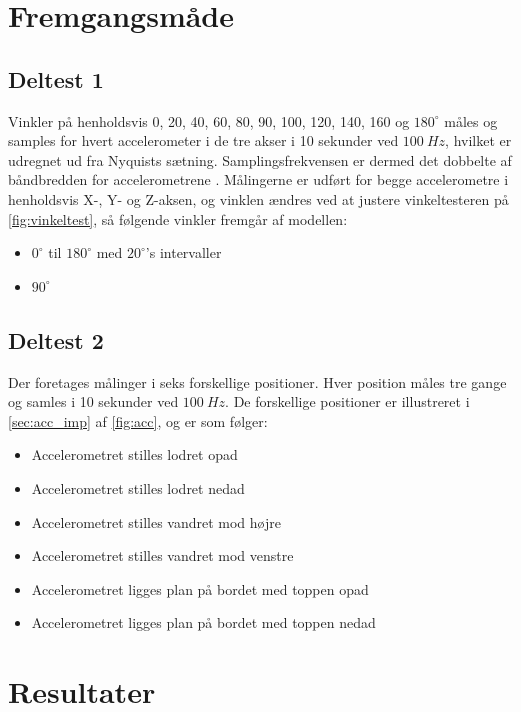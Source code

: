 \section{Fremgangsmåde}  

\subsection{Deltest 1} \label{sec:vinkel_fremgangsmaade}
Vinkler på henholdsvis 0, 20, 40, 60, 80, 90, 100, 120, 140, 160 og $180^{\circ}$ måles og samples for hvert accelerometer i de tre akser i 10 sekunder ved $100~Hz$, hvilket er udregnet ud fra Nyquists sætning. Samplingsfrekvensen er dermed det dobbelte af båndbredden for accelerometrene \citep{analogdevices2010}. Målingerne er udført for begge accelerometre i henholdsvis X-, Y- og Z-aksen, og vinklen ændres ved at justere vinkeltesteren på \autoref{fig:vinkeltest}, så følgende vinkler fremgår af modellen:

\begin{itemize}
\item $0^{\circ}$ til $180^{\circ}$ med $20^{\circ}$'s intervaller
\item $90^{\circ}$  
\end{itemize}

\subsection{Deltest 2}\label{sec:acc_fremgangsmaade}
Der foretages målinger i seks forskellige positioner. Hver position måles tre gange og samles i 10 sekunder ved $100~Hz$. De forskellige positioner er illustreret i \autoref{sec:acc_imp} af \autoref{fig:acc}, og er som følger: 
\begin{itemize}
\item Accelerometret stilles lodret opad
\item Accelerometret stilles lodret nedad
\item Accelerometret stilles vandret mod højre
\item Accelerometret stilles vandret mod venstre
\item Accelerometret ligges plan på bordet med toppen opad
\item Accelerometret ligges plan på bordet med toppen nedad
\end{itemize}

\section{Resultater} 

